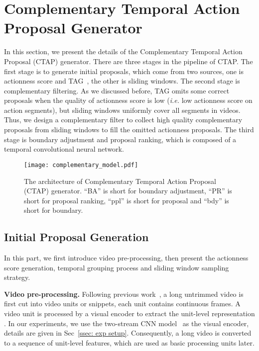 \documentclass[runningheads]{llncs}
\begin{document}
\section{Complementary Temporal Action Proposal Generator}\label{sec: method}
In this section, we present the details of the Complementary Temporal Action Proposal (CTAP) generator. There are three stages in the pipeline of CTAP. The first stage is to generate initial proposals, which come from two sources, one is actionness score and TAG~\cite{Zhao_2017_ICCV}, the other is sliding windows. The second stage is complementary filtering. As we discussed before, TAG omits some correct proposals when the quality of actionness score is low (\emph{i.e.} low actionness score on action segments), but sliding windows uniformly cover all segments in videos. Thus, we design a complementary filter to collect high quality complementary proposals from sliding windows to fill the omitted actionness proposals. The third stage is boundary adjustment and proposal ranking, which is composed of a temporal convolutional neural network.



\begin{figure}[t]
  \centering
    \texttt{[image: complementary\_model.pdf]}
    \caption{The architecture of Complementary Temporal Action Proposal (CTAP) generator. ``BA'' is short for boundary adjustment, ``PR'' is short for proposal ranking, ``ppl'' is short for proposal and ``bdy'' is short for boundary.}
      \label{fig: model}
\end{figure}

\subsection{Initial Proposal Generation}
In this part, we first introduce video pre-processing, then present the actionness score generation, temporal grouping process and sliding window sampling strategy. 

\textbf{Video pre-processing.} Following previous work~\cite{Gao_2017_ICCV}, a long untrimmed video is first cut into video units or snippets, each unit contains  continuous frames. A video unit  is processed by a visual encoder  to extract the unit-level representation . In our experiments, we use the two-stream CNN model~\cite{simonyan2014two,xiong2016cuhk} as the visual encoder, details are given in Sec~\ref{ssec: exp setup}. Consequently, a long video is converted to a sequence of unit-level features, which are used as basic processing units later.
\end{document}

